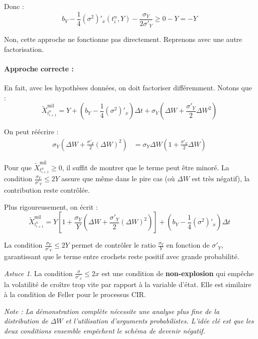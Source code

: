 \documentclass[12pt,a4paper]{article}
\theoremstyle{definition}
\theoremstyle{remark}
\newtheorem*{astuce}{Astuce}
\begin{document}
Donc :
\[
b_Y - \frac{1}{4}(\sigma^2)'_x(t_i^n, Y) - \frac{\sigma_Y}{2\sigma'_Y} \geq 0 - Y = -Y
\]

Non, cette approche ne fonctionne pas directement. Reprenons avec une autre factorisation.

\paragraph{Approche correcte :}
En fait, avec les hypothèses données, on doit factoriser différemment. Notons que :
\begin{equation}
\tilde{X}_{t_{i+1}^n}^{\text{mil}} = Y + \left(b_Y - \frac{1}{4}(\sigma^2)'_x\right)\Delta t + \sigma_Y\left(\Delta W + \frac{\sigma'_Y}{2}\Delta W^2\right)
\end{equation}

On peut réécrire :
\begin{align*}
\sigma_Y\left(\Delta W + \frac{\sigma'_Y}{2}(\Delta W)^2\right) &= \sigma_Y \Delta W \left(1 + \frac{\sigma'_Y}{2}\Delta W\right)
\end{align*}

Pour que $\tilde{X}_{t_{i+1}^n}^{\text{mil}} \geq 0$, il suffit de montrer que le terme peut être minoré. La condition $\frac{\sigma_Y}{\sigma'_Y} \leq 2Y$ assure que même dans le pire cas (où $\Delta W$ est très négatif), la contribution reste contrôlée.

Plus rigoureusement, on écrit :
\[
\tilde{X}_{t_{i+1}^n}^{\text{mil}} = Y\left[1 + \frac{\sigma_Y}{Y}\left(\Delta W + \frac{\sigma'_Y}{2}(\Delta W)^2\right)\right] + \left(b_Y - \frac{1}{4}(\sigma^2)'_x\right)\Delta t
\]

La condition $\frac{\sigma_Y}{\sigma'_Y} \leq 2Y$ permet de contrôler le ratio $\frac{\sigma_Y}{Y}$ en fonction de $\sigma'_Y$, garantissant que le terme entre crochets reste positif avec grande probabilité.

\begin{astuce}
La condition $\frac{\sigma}{\sigma'_x} \leq 2x$ est une condition de \textbf{non-explosion} qui empêche la volatilité de croître trop vite par rapport à la variable d'état. Elle est similaire à la condition de Feller pour le processus CIR.
\end{astuce}

\textit{Note : La démonstration complète nécessite une analyse plus fine de la distribution de $\Delta W$ et l'utilisation d'arguments probabilistes. L'idée clé est que les deux conditions ensemble empêchent le schéma de devenir négatif.}
\end{document}
